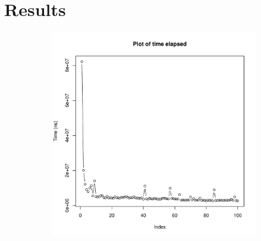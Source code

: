 \documentclass[11pt,a4paper]{vutinfth}
\begin{document}
\section{Results}

\begin{figure}
	\centering
	\begin{subfigure}[b]{\textwidth}
		\centering
		\includegraphics[page=1, scale=0.50]{Rplots_n(5-0).pdf}
		\caption{\label{fig:plot1_n5,0}}
	\end{subfigure}
	

\end{figure}
\end{document}
